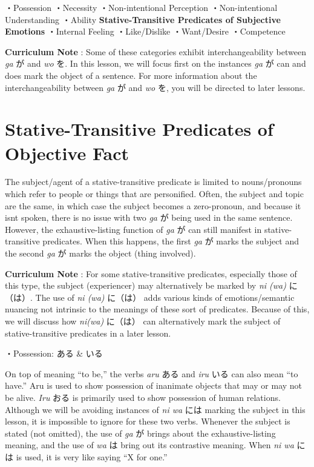 \par{・Possession \hfill\break
・Necessity \hfill\break
・Non-intentional Perception \hfill\break
・Non-intentional Understanding \hfill\break
・Ability }
\textbf{Stative-Transitive Predicates of Subjective Emotions }・Internal Feeling \hfill\break
・Like\slash Dislike \hfill\break
・Want\slash Desire \hfill\break
・Competence 
\par{\textbf{Curriculum Note }: Some of these categories exhibit interchangeability between \emph{ga }が and \emph{wo }を. In this lesson, we will focus first on the instances \emph{ga }が can and does mark the object of a sentence. For more information about the interchangeability between \emph{ga }が and \emph{wo }を, you will be directed to later lessons. }
      
\section{Stative-Transitive Predicates of Objective Fact}
 
\par{ The subject\slash agent of a stative-transitive predicate is limited to nouns\slash pronouns which refer to people or things that are personified. Often, the subject and topic are the same, in which case the subject becomes a zero-pronoun, and because it isn\textquotesingle t spoken, there is no issue with two \emph{ga }が being used in the same sentence. However, the exhaustive-listing function of \emph{ga }が can still manifest in stative-transitive predicates. When this happens, the first \emph{ga }が marks the subject and the second \emph{ga }が marks the object (thing involved). }

\par{\textbf{Curriculum Note }: For some stative-transitive predicates, especially those of this type, the subject (experiencer) may alternatively be marked by \emph{ni (wa) }に（は）. The use of \emph{ni (wa) }に（は） adds various kinds of emotions\slash semantic nuancing not intrinsic to the meanings of these sort of predicates. Because of this, we will discuss how \emph{ni(wa) }に（は） can alternatively mark the subject of stative-transitive predicates in a later lesson. }

\par{・Possession: ある \& いる }

\par{ On top of meaning “to be,” the verbs \emph{aru }ある and \emph{iru }いる can also mean “to have.” Aru is used to show possession of inanimate objects that may or may not be alive. \emph{Iru }おる is primarily used to show possession of human relations. Although we will be avoiding instances of \emph{ni wa }には marking the subject in this lesson, it is impossible to ignore for these two verbs. Whenever the subject is stated (not omitted), the use of \emph{ga }が brings about the exhaustive-listing meaning, and the use of \emph{wa }は bring out its contrastive meaning. When \emph{ni wa }には is used, it is very like saying “X for one.” }

